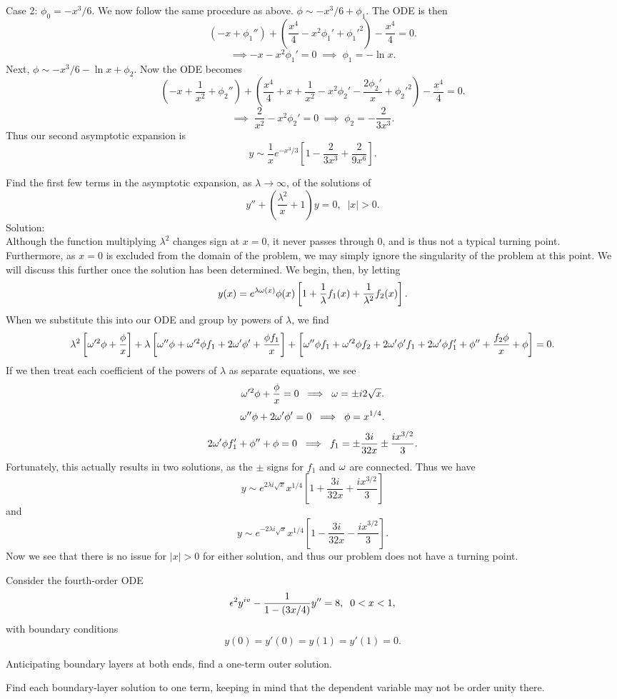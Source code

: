 \item Case 2: $\phi_0=-x^3/6.$ We now follow the same procedure as above. $\phi\sim -x^3/6+\phi_1.$ The ODE is then
$$(-x+\phi_1'')+(\frac{x^4}{4}-x^2\phi_1'+\phi_1'^2)-\frac{x^4}{4}=0.$$
$$\implies -x-x^2\phi_1'=0\;\implies\; \phi_1=-\ln x.$$
Next, $\phi\sim -x^3/6-\ln x+\phi_2.$ Now the ODE becomes
$$(-x+\frac{1}{x^2}+\phi_2'')+(\frac{x^4}{4}+x+\frac{1}{x^2}-x^2\phi_2'-\frac{2\phi_2'}{x}+\phi_2'^2)-\frac{x^4}{4}=0.$$
$$\implies\; \frac{2}{x^2}-x^2\phi_2'=0\;\implies \; \phi_2=-\frac{2}{3x^3}.$$
Thus our second asymptotic expansion is
$$y\sim \frac{1}{x}e^{-x^3/3}[1-\frac{2}{3x^3}+\frac{2}{9x^6}].$$

\eenum
\item Find the first few terms in the asymptotic expansion, as $\lambda\to\infty$, of the solutions of
    $$y''+\left(\frac{\lambda^2}{x}+1\right)y=0,\;\;|x|>0.$$
    Solution:\\

    Although the function multiplying $\lambda^2$ changes sign at $x=0$, it never passes through 0, and is thus not a typical turning point. Furthermore,  as $x=0$ is excluded from the domain of the problem, we may simply ignore the singularity of the problem at this point. We will discuss this further once the solution has been determined. We begin, then, by letting
    $$y(x)=e^{\lambda\omega(x)}\phi(x)\left[1+\frac{1}{\lambda}f_1(x)+\frac{1}{\lambda^2}f_2(x)\right].$$
    When we substitute this into our ODE and group by powers of $\lambda$, we find
    $$\lambda^2 \left[\omega'^2\phi+\frac{\phi}{x}\right]+\lambda\left[\omega''\phi+\omega'^2\phi f_1+2\omega'\phi'+\frac{\phi f_1}{x}\right]+\left[\omega''\phi f_1+\omega'^2\phi f_2+2\omega'\phi'f_1+2\omega'\phi f_1'+\phi''+\frac{f_2\phi}{x}+\phi\right]=0.$$
    If we then treat each coefficient of the powers of $\lambda$ as separate equations, we see
    $$\omega'^2\phi+\frac{\phi}{x}=0\;\implies \;\omega=\pm i2\sqrt{x}.$$
    $$\omega''\phi+2\omega'\phi'=0\;\implies \; \phi=x^{1/4}.$$
    $$2\omega'\phi f_1'+\phi''+\phi=0\;\implies\; f_1=\pm\frac{3 i}{32 x}\pm\frac{ix^{3/2}}{3}.$$
    Fortunately, this actually results in two solutions, as the $\pm$ signs for $f_1$ and $\omega$ are connected. Thus we have
    $$y\sim e^{2\lambda i\sqrt{x}}x^{1/4}\left[1+\frac{3i}{32x}+\frac{i x^{3/2}}{3}\right]$$
    and
    $$y\sim e^{-2\lambda i\sqrt{x}}x^{1/4}\left[1-\frac{3i}{32 x}-\frac{ix^{3/2}}{3}\right].$$
    Now we see that there is no issue for $|x|>0$ for either solution, and thus our problem does not have a turning point.

\item Consider the fourth-order ODE
$$\epsilon^2y^{iv}-\frac{1}{1-(3x/4)}y''=8,\;\;0<x<1,$$
with boundary conditions
$$y(0)=y'(0)=y(1)=y'(1)=0.$$
\benum
\item Anticipating boundary layers at both ends, find a one-term outer solution.
\item Find each boundary-layer solution to one term, keeping in mind that the dependent variable may not be order unity there.
\eenum

